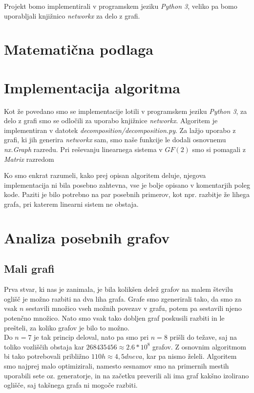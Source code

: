 \documentclass[12pt,a4paper]{amsart}
\theoremstyle{definition} %
\theoremstyle{plain} %
\begin{document}
Projekt bomo implementirali v programskem jeziku \emph{Python 3}, veliko pa bomo uporabljali knjižnico \emph{networkx} za delo z grafi.

\section{Matematična podlaga}



\section{Implementacija algoritma}
Kot že povedano smo se implementacije lotili v programskem jeziku \emph{Python 3}, za delo z grafi smo se odločili za uporabo knjižnice \emph{networkx}.
Algoritem je implementiran v datotek \emph{decomposition/decomposition.py}. Za lažjo uporabo z grafi, ki jih generira \emph{networkx} sam, smo naše funkcije
le dodali osnovnemu \emph{nx.Graph} razredu.
Pri reševanju linearnega sistema v $GF(2)$ smo si pomagali z \emph{Matrix} razredom %

Ko smo enkrat razumeli, kako prej opisan algoritem deluje, njegova implementacija ni bila posebno zahtevna, vse je bolje opisano v komentarjih poleg kode.
Paziti je bilo potrebno na par posebnih primerov, kot npr. razbitje že lihega grafa, pri katerem linearni sistem ne obstaja.

\section{Analiza posebnih grafov}

\subsection{Mali grafi}

Prva stvar, ki nas je zanimala, je bila kolikšen delež grafov na malem številu oglišč je možno razbiti na dva liha grafa.
Grafe smo zgenerirali tako, da smo za vsak $n$ sestavili množico vseh možnih povezav v grafu, potem pa sestavili njeno potenčno množico.
Nato smo vsak tako dobljen graf poskusili razbiti in le prešteli, za koliko grafov je bilo to možno.
\\

Do $n=7$ je tak princip deloval, nato pa smo pri $n=8$ prišli do težave, saj na toliko vozliščih obstaja kar $268435456 \approx 2.6 * 10^8$ grafov.
Z osnovnim algoritmom bi tako potrebovali približno $110h \approx 4,5 dneva$, kar pa nismo želeli. Algoritem smo najprej malo optimizirali, namesto sesnamov smo
na primernih mestih uporabili sete oz. generatorje, in na začetku preverili ali ima graf kakšno izolirano oglišče, saj takšnega grafa ni mogoče razbiti.
\\
\end{document}
